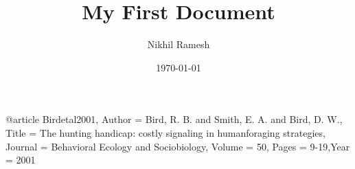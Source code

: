 \documentclass[a4paper,12pt]{article}
\begin{document}
\title{My First Document}
\author{Nikhil Ramesh}
\date{\today}
\maketitle

@article{
Birdetal2001,
	Author = {Bird, R. B. and Smith, E. A. and Bird, D. W.},
	Title = {The hunting handicap: costly signaling in humanforaging strategies},
	Journal = {Behavioral Ecology and Sociobiology},
	Volume = {50},
	Pages = {9-19},Year = {2001} }




  
  
  
\end{document}
